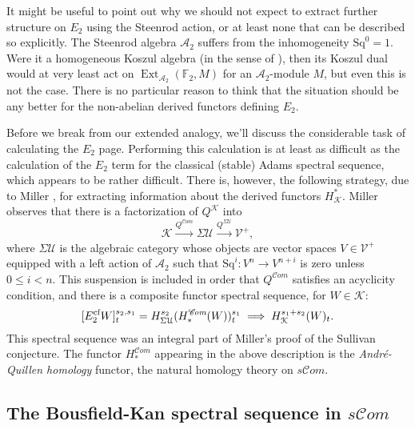\documentclass[11pt]{amsart} \renewcommand{\baselinestretch}{1.2}
\theoremstyle{plain}
\theoremstyle{definition}
\DeclareMathOperator{\Ext}{Ext}
\renewcommand{\to}{\longrightarrow}
\newcommand{\scrC}{\mathscr{C}}
\newcommand{\calV}{\mathcal{V}}
\newcommand{\calu}{\mathcal{U}}
\newcommand{\cala}{\mathcal{A}}
\newcommand{\calk}{\mathcal{K}}
\newcommand{\vect}[2]{\calV^{#1}_{#2}}
\newcommand{\Sq}{\mathrm{Sq}}
\newcommand{\F}{\mathbb{F}}
\newcommand{\algs}{{\scrC\!\textit{om}}}
\newcommand{\Ftwo}{\F_2}
\newcommand{\E}[5]{[E^{#1}_{#2}#3]^{#4}_{#5}}
\begin{document}
\begin{Introduction}
It might be useful to point out why we should not expect to extract further structure on $E_2$ using the Steenrod action, or at least none that can be described so explicitly. The Steenrod algebra $\cala_2$ suffers from the inhomogeneity $\Sq^0=1$. Were it a homogeneous Koszul algebra (in the sense of \cite{PriddyKoszul.pdf}), then its Koszul dual would at very least act on $\Ext_{\cala_2}(\Ftwo,M)$ for an $\cala_2$-module $M$, but even this is not the case. 
There is no particular reason to think that the situation should be any better for the non-abelian derived functors defining $E_2$.

Before we break from our extended analogy, we'll discuss the considerable task of calculating the $E_2$ page. Performing this calculation is at least as difficult as the calculation of the $E_2$ term for the classical (stable) Adams spectral sequence, which appears to be rather difficult. There is, however, the following strategy, due to Miller \cite{MillerSullivanConjecture.pdf}, for extracting information about the derived functors $H^*_{\calk}$. Miller  observes that there is a factorization of $Q^{\calk}$ into 
\[\calk\overset{Q^{\algs}}{\to} \Sigma\calu \overset{Q^{\Sigma\calu}}{\to}\vect{+}{},\]
where $\Sigma\calu$ is the algebraic category whose objects are vector spaces $V\in\vect{+}{}$ equipped with a left action of $\cala_2$ such that $\Sq^i:V^n\to V^{n+i}$ is zero unless $0\leq i <n$.
This suspension is included in order that $Q^\algs$ satisfies an acyclicity condition, and  there is a composite functor spectral sequence, for $W\in\calk$:
\[\E{\textup{cf}}{2}{W}{s_2,s_1}{t}=H^{s_2}_{\Sigma\calu}(H_*^{\algs}(W))^{s_1}_t\implies H^{s_1+s_2}_\calk (W)_t.\]
This spectral sequence was an integral part of Miller's proof of the Sullivan conjecture. The functor $H_*^{\algs}$ appearing in the above description is the \emph{Andr\'e-Quillen  homology} functor, the natural homology theory on $s\algs$. 
\subsection{The Bousfield-Kan spectral sequence in $s\algs$}


\end{Introduction}
\end{document}
